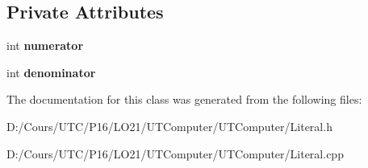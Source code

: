 \subsection*{Private Attributes}
\begin{DoxyCompactItemize}
\item 
int {\bfseries numerator}\hypertarget{class_rational_literal_a64272f36ce8cc1f7929b74608cd29005}{}\label{class_rational_literal_a64272f36ce8cc1f7929b74608cd29005}

\item 
int {\bfseries denominator}\hypertarget{class_rational_literal_a40594a67e9a9328d1e060c83408cedc0}{}\label{class_rational_literal_a40594a67e9a9328d1e060c83408cedc0}

\end{DoxyCompactItemize}


The documentation for this class was generated from the following files\+:\begin{DoxyCompactItemize}
\item 
D\+:/\+Cours/\+U\+T\+C/\+P16/\+L\+O21/\+U\+T\+Computer/\+U\+T\+Computer/Literal.\+h\item 
D\+:/\+Cours/\+U\+T\+C/\+P16/\+L\+O21/\+U\+T\+Computer/\+U\+T\+Computer/Literal.\+cpp\end{DoxyCompactItemize}
